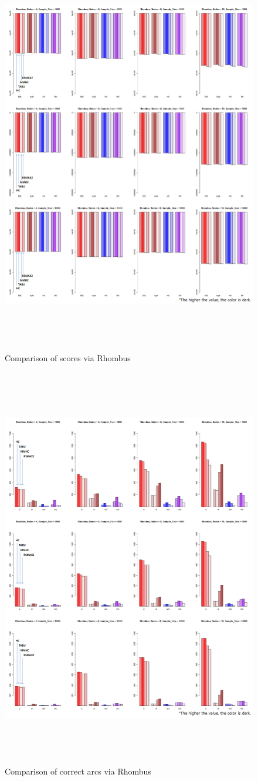 	\begin{figure}[p]
	\centering
		\includegraphics[height=500pt]{06_Rhombus_Score}
		\caption{Comparison of scores via Rhombus}
	\end{figure}	

	\begin{figure}[p]
	\centering
		\includegraphics[height=500pt]{06_Rhombus_Arcs}
		\caption{Comparison of correct arcs via Rhombus}
	\end{figure}	

